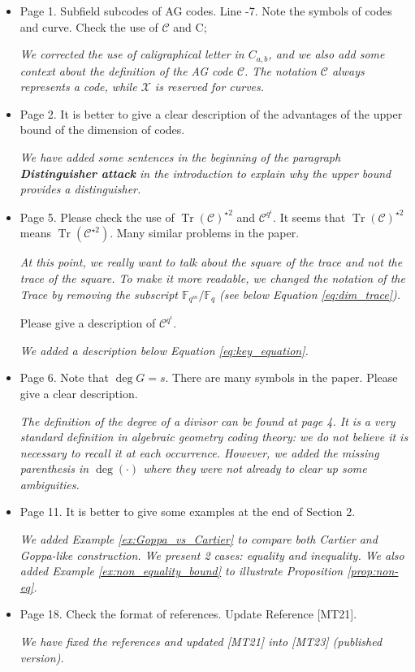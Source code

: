 \documentclass[12pt,a4paper]{amsart}
\DeclareMathOperator{\trace}{Tr}
\newcommand{\calC}{\mathcal{C}}
\newcommand{\calX}{\mathcal{X}}
\newcommand{\Tr}[1]{\trace\!\left(#1\right)}
\begin{document}
\begin{itemize}
 
\item  Page 1. Subfield subcodes of AG codes. Line -7. Note the symbols of codes and curve. Check the use of $\calC$ and C; 

\textit{We corrected the use of caligraphical letter in $C_{a,b}$, and we also add some context about the definition of the AG code $\calC$. The notation $\calC$ always represents a code, while $\calX$ is reserved for curves.}
 
\item Page 2. It is better to give a clear description of the advantages of the upper bound of the dimension of codes.

\textit{We have added some sentences in the beginning of the paragraph \textbf{Distinguisher attack} in the introduction to explain why the upper bound provides a distinguisher.}


\item  Page 5. Please check the use of $\Tr{\calC}^{\star 2}$ and $\calC^{q^i}$. It seems that $\Tr{\calC}^{\star 2}$ means $\Tr{\calC^{\star 2}}$. Many similar problems in the paper.

\textit{At this point, we really want to talk about the square of the trace and not the trace of the square. To make it more readable, we changed the notation of the Trace by removing the subscript $\mathbb{F}_{q^m}/\mathbb{F}_q$ (see below Equation \eqref{eq:dim_trace}).}

\noindent Please give a description of $\calC^{q^i}$.
 
\textit{We added a description below Equation \eqref{eq:key_equation}.}

\item Page 6. Note that $\deg G = s$. There are many symbols in the paper. Please give a clear description.

\textit{The definition of the degree of a divisor can be found at page 4. It is a very standard definition in algebraic geometry coding theory: we do not believe it is necessary to recall it at each occurrence. However, we added the missing parenthesis in $\deg\left(\cdot\right)$ where they were not already to clear up some ambiguities.}


\item Page 11. It is better to give some examples at the end of Section 2.

\textit{We added Example \ref{ex:Goppa_vs_Cartier} to compare both Cartier and Goppa-like construction. We present 2 cases: equality and inequality. We also added Example \ref{ex:non_equality_bound} to illustrate Proposition \ref{prop:non-eq}.}



\item Page 18. Check the format of references. Update Reference [MT21].

\textit{We have fixed the references and updated [MT21] into [MT23] (published version).}

\end{itemize} 
\end{document}
